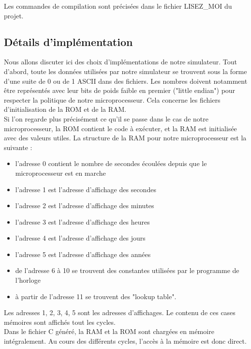 \documentclass[a4paper, 12pt, twoside]{report}
\begin{document}
Les commandes de compilation sont précisées dans le fichier LISEZ\_MOI du projet.\\

\subsection{Détails d'implémentation}
Nous allons discuter ici des choix d'implémentations de notre simulateur. 
Tout d'abord, toute les données utilisées par notre simulateur se trouvent sous la forme 
d'une suite de 0 ou de 1 ASCII dans des fichiers. Les nombres doivent notamment être représentés 
avec leur bits de poids faible en premier ("little endian") pour respecter la politique de notre microprocesseur. 
Cela concerne les fichiers d'initialisation de la ROM et de la RAM.\\

Si l'on regarde plus précisément ce qu'il se passe dans le cas de notre microprocesseur, 
la ROM contient le code à exécuter, et la RAM est initialisée avec des valeurs utiles. La structure de 
la RAM pour notre microprocesseur est la suivante :
\begin{itemize}
\item l'adresse 0 contient le nombre de secondes écoulées depuis que le microprocesseur est en marche
\item l'adresse 1 est l'adresse d'affichage des secondes
\item l'adresse 2 est l'adresse d'affichage des minutes
\item l'adresse 3 est l'adresse d'affichage des heures
\item l'adresse 4 est l'adresse d'affichage des jours
\item l'adresse 5 est l'adresse d'affichage des années
\item de l'adresse 6 à 10 se trouvent des constantes utilisées par le programme de l'horloge
\item à partir de l'adresse 11 se trouvent des "lookup table".\\
\end{itemize}

Les adresses 1, 2, 3, 4, 5 sont les adresses d'affichages. Le contenu de ces cases mémoires sont 
affichés tout les cycles.\\

Dans le fichier C généré, la RAM et la ROM sont chargées en mémoire intégralement. Au cours 
des différents cycles, l'accès à la mémoire est donc direct.\\
\end{document}
